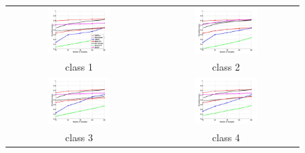 \begin{figure}[h]
	\centering
	\begin{tabular}{cc}
		\includegraphics[width=0.45\textwidth]{appendix/tables/MNIST_Rate_5_class_1.jpg} & 
		\includegraphics[width=0.45\textwidth]{appendix/tables/MNIST_Rate_5_class_2.jpg} \\
		class 1 & class 2\\
		\includegraphics[width=0.45\textwidth]{appendix/tables/MNIST_Rate_5_class_3.jpg} & 
		\includegraphics[width=0.45\textwidth]{appendix/tables/MNIST_Rate_5_class_4.jpg} \\
		class 3 & class 4\\
	\end{tabular}
\end{figure}
